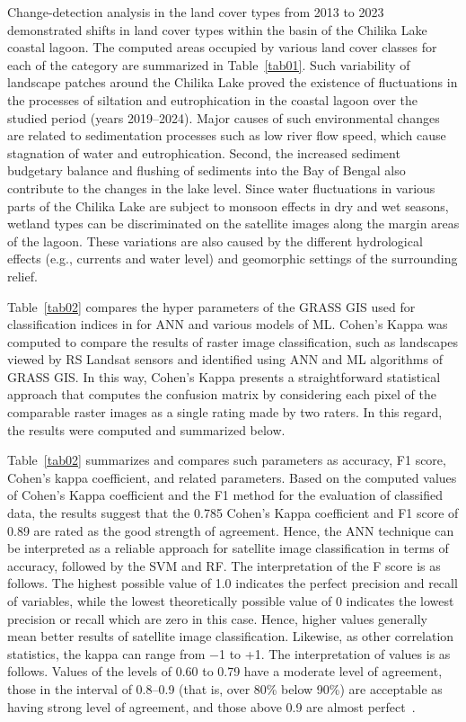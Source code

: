 \documentclass[jmse,article,accept,pdftex,oneauthor]{Definitions/mdpi}
\begin{document}
Change-detection analysis in the land cover types from 2013 to 2023 demonstrated shifts in land cover types within the basin of the Chilika Lake coastal lagoon. The computed areas occupied by various land cover classes for each of the category are summarized in Table~\ref{tab01}. Such variability of landscape patches around the Chilika Lake proved the existence of  fluctuations in the processes of siltation and eutrophication in the coastal lagoon over the studied period (years 2019--2024). Major causes of such environmental changes are related to   sedimentation processes such as low river flow speed, which cause stagnation of water and eutrophication. Second, the increased sediment budgetary balance and flushing of sediments into the Bay of Bengal also contribute to the changes in the lake level. Since water fluctuations in various parts of the Chilika Lake are subject to   monsoon effects in dry and wet seasons, wetland types can be discriminated on the satellite images along the margin areas of the lagoon. These variations are also caused by the different hydrological effects (e.g., currents and water level) and geomorphic settings of the surrounding relief. 
 
 Table~\ref{tab02} compares the hyper parameters of the GRASS GIS used for classification indices in for ANN and various models of ML.  Cohen's Kappa was computed to compare the results of raster image classification, such as landscapes viewed by RS Landsat sensors and identified using ANN and ML algorithms of GRASS GIS. In this way,   Cohen's Kappa presents a straightforward statistical approach that computes the confusion matrix by considering each pixel of the comparable raster images as a single rating made by two raters. In this regard, the results were computed and summarized below.
 
 Table~\ref{tab02} summarizes and compares such parameters as accuracy, F1 score, Cohen's kappa coefficient, and related parameters. Based on the computed values of Cohen's Kappa coefficient and the F1 method for the evaluation of classified data, the results suggest that the 0.785 Cohen's Kappa coefficient and F1 score of 0.89 are rated as the good strength of agreement. Hence, the ANN technique can be interpreted as a reliable approach for satellite image classification in terms of accuracy, followed by the SVM and RF. The interpretation of the  F score is as follows. The highest possible value of 1.0  indicates the perfect precision and recall of variables, while the lowest theoretically possible value of 0 indicates the lowest precision or recall which are zero in this case. Hence,  higher values generally mean better results of satellite image classification. Likewise, as other correlation statistics, the kappa can range from {$-$}1 to +1. The interpretation of values is as follows. Values of the levels of 0.60 to 0.79 have  a moderate level of agreement, those in the interval of 0.8--0.9 (that is, over 80\% below 90\%) are acceptable as having strong level of agreement, and those above 0.9 are almost perfect~{\cite{McHugh}.}%
\end{document}
